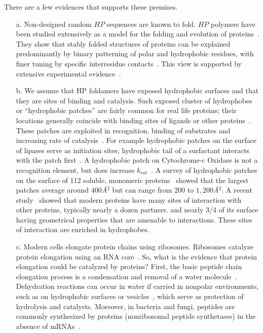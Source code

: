 \documentclass[journal=jacsat,manuscript=article,layout=twocolumn]{achemso}
\begin{document}
There are a few evidences that supports these premises.
\begin{itemize}
\item [a.] Non-designed random $HP$ sequences 
are known to fold.  $HP$ polymers have been studied extensively as a model for the folding and 
evolution of proteins~\cite{lau1989lattice,Chan1991,Miller1995,Yue1995,agarwala1997local}.  They 
show that stably folded structures of proteins can be explained predominantly by binary patterning 
of polar and hydrophobic residues, with finer tuning by specific interresidue 
contacts~\cite{Yue1992,Xiong1995}.  This view is supported by extensive experimental 
evidence~\cite{Lim1991,Kamtekar1993,Wei2003,Brisendine2015}. 

\item [b.]
We assume that HP foldamers have exposed hydrophobic surfaces and that they are sites of binding 
and catalysis. Such exposed cluster of hydrophobes or ``hydrophobic patches'' are fairly common for 
real life proteins; their locations generally coincide with binding sites of ligands or other 
proteins~\cite{Lijnzaad1996}. These patches are exploited in recognition, binding of substrates and 
increasing rate of catalysis~\cite{MitchellGuss1983,Lijnzaad1996,VanEe1997,Witt1998}. For example 
hydrophobic patches on the surface of lipases serve as initiation sites; hydrophobic tail of a 
surfactant interacts with the patch first~\cite{VanEe1997}. A hydrophobic patch on Cytochrome-c 
Oxidase is not a recognition element, but does increase $k_{cat}$~\cite{Witt1998}. A survey of 
hydrophobic patches on the surface of 112 soluble, monomeric proteins~\cite{Lijnzaad1996} showed 
that the largest patches average around $400$\textit{\AA}$^2$ but can range from $200$ to 
$1,200$\textit{\AA}$^2$. A recent study~\cite{Tonddast-Navaei2015} showed that modern proteins have 
many sites of interaction with other proteins, typically nearly a dozen partners.  and nearly 3/4 
of 
its surface having geometrical properties that are amenable to interactions. These sites of 
interaction are enriched in hydrophobes.

\item [c.] Modern cells elongate protein chains using 
ribosomes.  Ribosomes catalyze protein elongation using an RNA core~\cite{Nissen2000}.  So, what is 
the evidence that protein elongation could be catalyzed by proteins?  First, the basic peptide 
chain elongation process is a condensation and removal of a water 
molecule~\cite[chapter 3, p.~82]{Nelson2008}.  Dehydration reactions can occur in water if carried 
in nonpolar environments, such as on hydrophobic surfaces or 
vesicles~\cite{Manabe2001,Manabe2002}, which serve as protection of hydrolysis and catalysts.  
Moreover, in bacteria and fungi, peptides are commonly synthesized by proteins (nonribosomal 
peptide synthetases) in the absence of mRNAs~\cite{Stachelhaus1998,marahiel2009working}.
\end{itemize}
\end{document}
